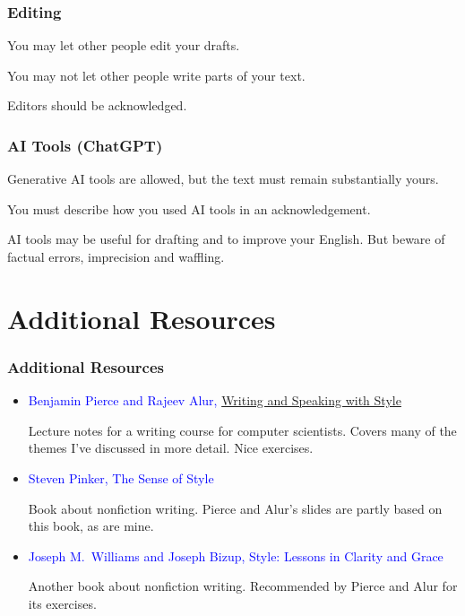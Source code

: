 \documentclass[xetex]{beamer}
\newcommand{\good}[1]{\textcolor{blue}{#1}}
\begin{document}
\begin{frame}
  \frametitle{Editing}

  You may let other people edit your drafts.

  \medskip
  \pause

  You may not let other people write parts of your text.

  \medskip
  \pause

  Editors should be acknowledged.
\end{frame}

\begin{frame}
  \frametitle{AI Tools (ChatGPT)}

  Generative AI tools are allowed, but the text must remain substantially yours.

  \medskip
  \pause

  You must describe how you used AI tools in an acknowledgement.

  \medskip
  \pause

  AI tools may be useful for drafting and to improve your English.
  But beware of factual errors, imprecision and waffling.
\end{frame}

\section{Additional Resources}

\begin{frame}
  \frametitle{Additional Resources}

  \begin{itemize}
    \item \good{Benjamin Pierce and Rajeev Alur, \href{https://docs.google.com/document/d/1_vBXbugoLjO171w3wovs3ugmRQI-O6EcSVFDBF7eUzE/edit}{Writing and Speaking with Style}}

          Lecture notes for a writing course for computer scientists.
          Covers many of the themes I've discussed in more detail.
          Nice exercises.
    \item \good{Steven Pinker, The Sense of Style}

          Book about nonfiction writing.
          Pierce and Alur's slides are partly based on this book, as are mine.

    \item \good{Joseph M.\ Williams and Joseph Bizup, Style: Lessons in Clarity and Grace}

          Another book about nonfiction writing.
          Recommended by Pierce and Alur for its exercises.
  \end{itemize}
\end{frame}
\end{document}
